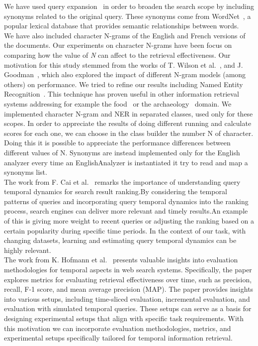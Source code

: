 We have used query expansion~\cite{efthimiadis1996query} in order to broaden the search scope by including synonyms
related to the original query. These synonyms come from WordNet~\cite{Fellbaum1998}, a popular lexical database that provides semantic relationships
between words.\\

We have also included character N-grams of the English and French versions of the documents.
Our experiments on character N-grams have been focus on comparing how the value of \textit{N} can affect to the
retrieval effectiveness.
Our motivation for this study stemmed from the works of T. Wilson et al.~\cite{wilson2008comparing}, and J.
Goodman~\cite{goodman2001bit}, which also explored the impact of different N-gram models (among others) on performance.
We tried to refine our results including Named Entity Recognition~\cite{mohit2014named}.
This technique has proven useful in other information retrieval systems addressing for example the
food~\cite{popovski2020survey} or the archaeology~\cite{brandsen2022can} domain. We implemented character N-gram and NER in separated classes, used only for these scopes. In order to appreciate the results of doing different running and calculate scores for each one, we can choose in the class builder the number N of character. Doing this it is possible to appreciate the performance differences between different values of N. 
Synonyms are instead implemented only for the English analyzer every time an EnglishAnalyzer is instantiated it try to read and map a synonyms list. \\


The work from F. Cai et al.~\cite{cai2014learning} remarks the importance of understanding query temporal dynamics for search result ranking.By considering the temporal patterns of queries and incorporating query temporal dynamics into the ranking process,
search engines can deliver more relevant and timely results.An example of this is giving more weight to recent queries or adjusting the ranking based on a certain popularity during
specific time periods. In the context of our task, with changing datasets, learning and estimating query temporal dynamics can be highly
relevant.\\

The work from K. Hofmann et al.~\cite{hofmann2014evaluating} presents valuable insights into evaluation methodologies for
temporal aspects in web search systems. Specifically, the paper explores metrics for evaluating retrieval effectiveness over time, such as precision, recall,
F-1 score, and mean average precision (MAP). The paper provides insights into various setups, including time-sliced evaluation, incremental evaluation, and
evaluation with simulated temporal queries. These setups can serve as a basis for designing experimental setups that align with specific task requirements.
With this motivation we can incorporate evaluation methodologies, metrics, and experimental setups specifically tailored
for temporal information retrieval.\\


